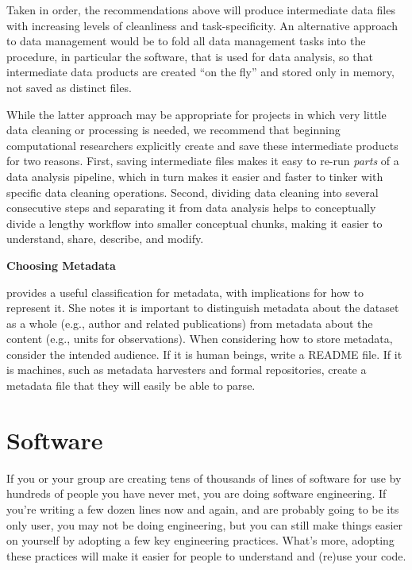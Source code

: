 \documentclass[10pt]{article}
\begin{document}
Taken in order, the recommendations above will produce intermediate
data files with increasing levels of cleanliness and
task-specificity. An alternative approach to data management would be
to fold all data management tasks into the procedure, in particular
the software, that is used for data analysis, so that intermediate
data products are created ``on the fly'' and stored only in memory,
not saved as distinct files.

While the latter approach may be appropriate for projects in which
very little data cleaning or processing is needed, we recommend that
beginning computational researchers explicitly create and save these
intermediate products for two reasons.  First, saving intermediate
files makes it easy to re-run \emph{parts} of a data analysis
pipeline, which in turn makes it easier and faster to tinker with
specific data cleaning operations.  Second, dividing data cleaning
into several consecutive steps and separating it from data analysis
helps to conceptually divide a lengthy workflow into smaller
conceptual chunks, making it easier to understand, share, describe, and modify.

\begin{framed}
  \noindent \textbf{Choosing Metadata}

  \cite{wickes2015} provides a useful classification for metadata,
  with implications for how to represent it. She notes it is important
  to distinguish metadata about the dataset as a whole (e.g., author
  and related publications) from metadata about the content (e.g.,
  units for observations).  When considering how to store metadata,
  consider the intended audience. If it is human beings, write a
  README file. If it is machines, such as metadata harvesters and
  formal repositories, create a metadata file that they will easily be
  able to parse.
\end{framed}

\section{Software}\label{sec:software}

If you or your group are creating tens of thousands of lines of
software for use by hundreds of people you have never met, you are
doing software engineering. If you're writing a few dozen lines now
and again, and are probably going to be its only user, you may not be
doing engineering, but you can still make things easier on yourself by
adopting a few key engineering practices. What's more, adopting these
practices will make it easier for people to understand and (re)use
your code.
\end{document}
